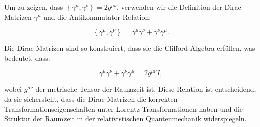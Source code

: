\documentclass[11pt,a4paper]{article}
\begin{document}
Um zu zeigen, dass $\left\{\gamma^\mu, \gamma^\nu\right\} = 2 g^{\mu \nu}$, verwenden wir die Definition der Dirac-Matrizen $\gamma^\mu$ und die Antikommutator-Relation:

\[
\left\{\gamma^\mu, \gamma^\nu\right\} = \gamma^\mu \gamma^\nu + \gamma^\nu \gamma^\mu.
\]

Die Dirac-Matrizen sind so konstruiert, dass sie die Clifford-Algebra erfüllen, was bedeutet, dass:

\[
\gamma^\mu \gamma^\nu + \gamma^\nu \gamma^\mu = 2 g^{\mu \nu} I,
\]

wobei $g^{\mu \nu}$ der metrische Tensor der Raumzeit ist. Diese Relation ist entscheidend, da sie sicherstellt, dass die Dirac-Matrizen die korrekten Transformationseigenschaften unter Lorentz-Transformationen haben und die Struktur der Raumzeit in der relativistischen Quantenmechanik widerspiegeln.
\end{document}
